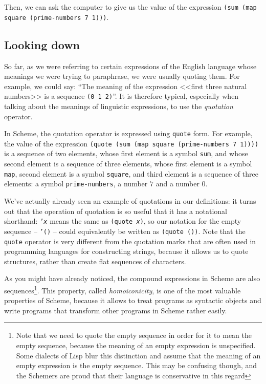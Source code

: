 Then, we can ask the computer to give us the value of the
expression \texttt{(sum (map square (prime-numbers 7 1)))}.

\subsection{Looking down}

So far, as we were referring to certain expressions of the English
language whose meanings we were trying to paraphrase, we were usually
quoting them. For example, we could say: ``The meaning
of the expression <<first three natural numbers>> is a sequence
\texttt{(0 1 2)}''. It is therefore typical, especially when
talking about the meanings of linguistic expressions, to use
the \textit{quotation} operator.

In Scheme, the quotation operator is expressed using
\texttt{quote} form. For example, the value of the expression
\texttt{(quote (sum (map square (prime\--numbers 7 1))))}
is a sequence of two elements, whose first element is
a symbol \texttt{sum}, and whose second element is a sequence
of three elements, whose first element is a symbol \texttt{map},
second element is a symbol \texttt{square}, and third element
is a sequence of three elements: a symbol \texttt{prime-numbers},
a number $7$ and a number $0$.

We've actually already seen an example of quotations in our
definitions: it turns out that the operation of quotation is
so useful that it has a notational shorthand: \texttt{'\textit{x}}
means the same as \texttt{(quote \textit{x})}, so our notation
for the empty sequence -- \texttt{'()} -- could equivalently
be written as \texttt{(quote ())}. Note that the \texttt{quote}
operator is very different from the quotation marks that are
often used in programming languages for constructing strings,
because it allows us to quote structures, rather than create
flat sequences of characters.

As you might have already noticed, the compound expressions
in Scheme are also sequences\footnote{Note that we need to quote
the empty sequence in order for it to mean the empty sequence,
because the meaning of an empty expression is unspecified.
Some dialects of Lisp blur this distinction and assume that
the meaning of an empty expression is the empty sequence.
This may be confusing though, and the Schemers are proud that
their language is conservative in this regard}.
This property, called \textit{homoiconicity},
is one of the most valuable properties of Scheme, because it
allows to treat programs as syntactic objects and write programs
that transform other programs in Scheme rather easily.

